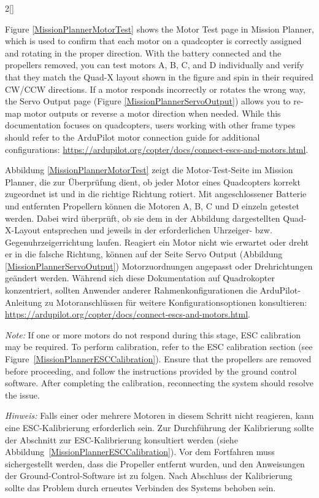 \begin{paracol}{2}[]
\colstart

Figure \ref{MissionPlannerMotorTest} shows the Motor Test page in Mission Planner, which is used to confirm that each motor on a quadcopter is correctly assigned and rotating in the proper direction. With the battery connected and the propellers removed, you can test motors A, B, C, and D individually and verify that they match the Quad-X layout shown in the figure and spin in their required CW/CCW directions. If a motor responds incorrectly or rotates the wrong way, the Servo Output page (Figure \ref{MissionPlannerServoOutput}) allows you to re-map motor outputs or reverse a motor direction when needed. While this documentation focuses on quadcopters, users working with other frame types should refer to the ArduPilot motor connection guide for additional configurations: \url{https://ardupilot.org/copter/docs/connect-escs-and-motors.html}.

\colger

Abbildung \ref{MissionPlannerMotorTest} zeigt die Motor-Test-Seite im Mission Planner, die zur Überprüfung dient, ob jeder Motor eines Quadcopters korrekt zugeordnet ist und in die richtige Richtung rotiert. Mit angeschlossener Batterie und entfernten Propellern können die Motoren A, B, C und D einzeln getestet werden. Dabei wird überprüft, ob sie dem in der Abbildung dargestellten Quad-X-Layout entsprechen und jeweils in der erforderlichen Uhrzeiger- bzw. Gegenuhrzeigerrichtung laufen. Reagiert ein Motor nicht wie erwartet oder dreht er in die falsche Richtung, können auf der Seite Servo Output (Abbildung \ref{MissionPlannerServoOutput}) Motorzuordnungen angepasst oder Drehrichtungen geändert werden. Während sich diese Dokumentation auf Quadrokopter konzentriert, sollten Anwender anderer Rahmenkonfigurationen die ArduPilot-Anleitung zu Motoranschlüssen für weitere Konfigurationsoptionen konsultieren: \url{https://ardupilot.org/copter/docs/connect-escs-and-motors.html}.

\coleng

\textsl{Note:} If one or more motors do not respond during this stage, ESC calibration may be required. To perform calibration, refer to the ESC calibration section (see Figure~\ref{MissionPlannerESCCalibration}). Ensure that the propellers are removed before proceeding, and follow the instructions provided by the ground control software. After completing the calibration, reconnecting the system should resolve the issue.

\colger

\textsl{Hinweis:} Falls einer oder mehrere Motoren in diesem Schritt nicht reagieren, kann eine ESC-Kalibrierung erforderlich sein. Zur Durchführung der Kalibrierung sollte der Abschnitt zur ESC-Kalibrierung konsultiert werden (siehe Abbildung~\ref{MissionPlannerESCCalibration}). Vor dem Fortfahren muss sichergestellt werden, dass die Propeller entfernt wurden, und den Anweisungen der Ground-Control-Software ist zu folgen. Nach Abschluss der Kalibrierung sollte das Problem durch erneutes Verbinden des Systems behoben sein.


\end{paracol}
